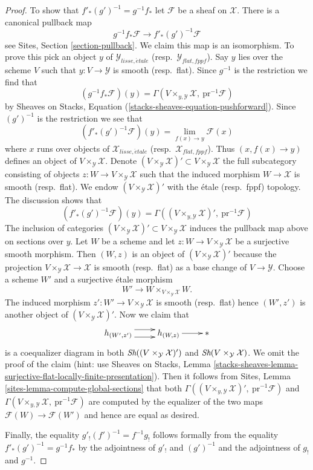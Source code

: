 \begin{proof}
\medskip\noindent
To show that $f'_*(g')^{-1} = g^{-1}f_*$ let $\mathcal{F}$ be a sheaf
on $\mathcal{X}$. There is a canonical pullback map
$$
g^{-1}f_*\mathcal{F} \longrightarrow f'_*(g')^{-1}\mathcal{F}
$$
see Sites, Section \ref{section-pullback}. We claim this map is an isomorphism.
To prove this pick an object $y$ of $\mathcal{Y}_{lisse,\acute{e}tale}$
(resp.\ $\mathcal{Y}_{flat,fppf}$). Say $y$ lies over the scheme $V$
such that $y : V \to \mathcal{Y}$ is smooth (resp.\ flat). Since
$g^{-1}$ is the restriction we find that
$$
\left(g^{-1}f_*\mathcal{F}\right)(y) =
\Gamma(V \times_{y, \mathcal{Y}} \mathcal{X},\ \text{pr}^{-1}\mathcal{F})
$$
by Sheaves on Stacks, Equation (\ref{stacks-sheaves-equation-pushforward}).
Since $(g')^{-1}$ is the restriction we see that
$$
\left(f'_*(g')^{-1}\mathcal{F}\right)(y) = \lim_{f(x) \to y} \mathcal{F}(x)
$$
where $x$ runs over objects of $\mathcal{X}_{lisse,\acute{e}tale}$
(resp.\ $\mathcal{X}_{flat,fppf}$). Thus $(x, f(x) \to y)$ defines an
object of $V \times_\mathcal{Y} \mathcal{X}$. Denote
$(V \times_\mathcal{Y} \mathcal{X})' \subset V \times_\mathcal{Y} \mathcal{X}$
the full subcategory consisting of objects
$z : W \to V \times_\mathcal{Y} \mathcal{X}$ such that the induced morphism
$W \to \mathcal{X}$ is smooth (resp.\ flat). We endow
$(V \times_\mathcal{Y} \mathcal{X})'$ with the \'etale (resp.\ fppf)
topology. The discussion shows that
$$
\left(f'_*(g')^{-1}\mathcal{F}\right)(y) =
\Gamma((V \times_{y, \mathcal{Y}} \mathcal{X})',
\ \text{pr}^{-1}\mathcal{F})
$$
The inclusion of categories
$(V \times_\mathcal{Y} \mathcal{X})' \subset V \times_\mathcal{Y} \mathcal{X}$
induces the pullback map above on sections over $y$.
Let $W$ be a scheme and let $z : W \to V \times_\mathcal{Y} \mathcal{X}$
be a surjective smooth morphism. Then $(W, z)$ is an object of
$(V \times_\mathcal{Y} \mathcal{X})'$ because the projection
$V \times_\mathcal{Y} \mathcal{X} \to \mathcal{X}$ is smooth (resp.\ flat)
as a base change of $V \to \mathcal{Y}$. Choose a scheme $W'$ and
a surjective \'etale morphism
$$
W' \longrightarrow W \times_{V \times_\mathcal{Y} \mathcal{X}} W.
$$
The induced morphism $z' : W' \to V \times_\mathcal{Y} \mathcal{X}$
is smooth (resp.\ flat) hence $(W', z')$
is another object of $(V \times_\mathcal{Y} \mathcal{X})'$.
Now we claim that
$$
\xymatrix{
h_{(W', z')} \ar@<1ex>[r] \ar@<-1ex>[r] & h_{(W, z)} \ar[r] & {*}
}
$$
is a coequalizer diagram in both $\mathop{\textit{Sh}}\nolimits((V \times_\mathcal{Y} \mathcal{X})')$
and $\mathop{\textit{Sh}}\nolimits(V \times_\mathcal{Y} \mathcal{X})$. We omit the proof of the claim
(hint: use Sheaves on Stacks, Lemma
\ref{stacks-sheaves-lemma-surjective-flat-locally-finite-presentation}).
Then it follows from
Sites, Lemma \ref{sites-lemma-compute-global-sections}
that both
$\Gamma((V \times_{y, \mathcal{Y}} \mathcal{X})',\ \text{pr}^{-1}\mathcal{F})$
and
$\Gamma(V \times_{y, \mathcal{Y}} \mathcal{X},\ \text{pr}^{-1}\mathcal{F})$
are computed by the equalizer of the two maps
$\mathcal{F}(W) \to \mathcal{F}(W')$ and hence are equal as desired.

\medskip\noindent
Finally, the equality $g'_!(f')^{-1} = f^{-1}g_!$ follows formally from
the equality $f'_*(g')^{-1} = g^{-1}f_*$ by the adjointness of
$g'_!$ and $(g')^{-1}$ and the adjointness of $g_!$ and $g^{-1}$.
\end{proof}
